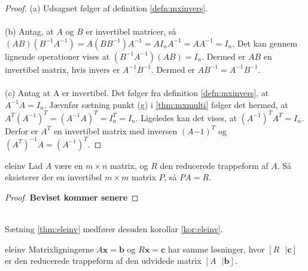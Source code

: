 %
%
\begin{proof}
(a)
Udsagnet følger af definition \ref{defn:mxinvers}. 
\\\\
(b) Antag, at $A$ og $B$ er invertibel matricer, så $(AB)(B^{-1}A^{-1})=A(BB^{-1})A^{-1}=AI_nA^{-1}=AA^{-1}=I_n$. 
Det kan gennem lignende operationer vises at $(B^{-1}A^{-1})(AB)=I_n$.
Dermed er $AB$ en invertibel matrix, hvis invers er $A^{-1}B^{-1}$.
Dermed er $AB^{-1}=A^{-1}B^{-1}$.
\\\\
(c) Antag at A er invertibel. 
Det følger fra definition \ref{defn:mxinvers}, at $A^{-1}A=I_n$. 
Jævnfør sætning punkt (g) i  \ref{thm:mxmulti} følger det hermed, at $A^T(A^{-1})^T=(A^{-1}A)^T=I_n^T=I_n$. 
Ligeledes kan det vises, at $(A^{-1})^TA^T=I_n$. 
Derfor er $A^T$ en invertibel matrix med inversen $(A{-1})^T$ og $(A^T)^{-1}A=(A^{-1})^T$.
\end{proof}
%
%
\begin{thm}{}{eleinv}
Lad $A$ være en $m \times n$ matrix, og $R$ den reducerede trappeform af $A$. 
Så eksisterer der en invertibel $m \times m$ matrix $P$, så $PA=R$.
\end{thm}
%
\begin{proof}
\textbf{Beviset kommer senere }
\end{proof}
%
\\
Sætning \ref{thm:eleinv} medfører desuden korollar \ref{kor:eleinv}.
\begin{kor}{}{eleinv}
Matrixligningerne $A\textbf{x}=\textbf{b}$ og $R\textbf{x}=\textbf{c}$ har samme løsninger, hvor 
$[R \text{   }| \textbf{c}]$
er den reducerede trappeform af den udvidede matrix 
$[A \text{   }| \textbf{b}].
$
\end{kor}
%
